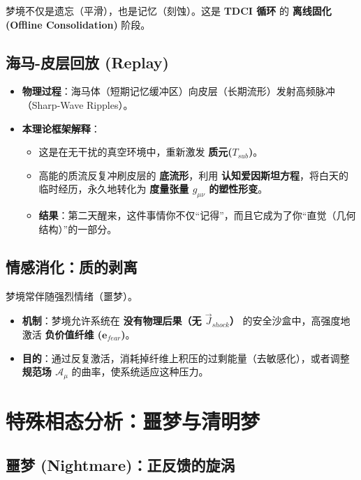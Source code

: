 梦境不仅是遗忘（平滑），也是记忆（刻蚀）。这是 \textbf{TDCI 循环} 的 \textbf{离线固化 (Offline Consolidation)} 阶段。

\subsection{海马-皮层回放 (Replay)}

\begin{itemize}
    \item \textbf{物理过程}：海马体（短期记忆缓冲区）向皮层（长期流形）发射高频脉冲（Sharp-Wave Ripples）。
    \item \textbf{本理论框架解释}：
    \begin{itemize}
        \item 这是在无干扰的真空环境中，重新激发 \textbf{质元($T_{sub}$)}。
        \item 高能的质流反复冲刷皮层的 \textbf{底流形}，利用 \textbf{认知爱因斯坦方程}，将白天的临时经历，永久地转化为 \textbf{度量张量 $g_{\mu\nu}$ 的塑性形变}。
        \item \textbf{结果}：第二天醒来，这件事情你不仅“记得”，而且它成为了你“直觉（几何结构）”的一部分。
    \end{itemize}
\end{itemize}

\subsection{情感消化：质的剥离}

梦境常伴随强烈情绪（噩梦）。
\begin{itemize}
    \item \textbf{机制}：梦境允许系统在 \textbf{没有物理后果（无 $\vec{J}_{shock}$）} 的安全沙盒中，高强度地激活 \textbf{负价值纤维 ($\mathbf{e}_{fear}$)}。
    \item \textbf{目的}：通过反复激活，消耗掉纤维上积压的过剩能量（去敏感化），或者调整 \textbf{规范场 $\mathcal{A}_\mu$} 的曲率，使系统适应这种压力。
\end{itemize}

\section{特殊相态分析：噩梦与清明梦}
\label{sec:section_4147}

\subsection{噩梦 (Nightmare)：正反馈的旋涡}

